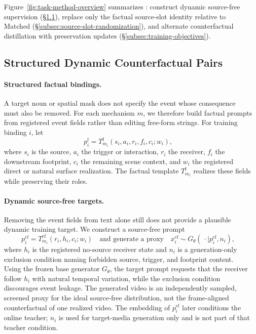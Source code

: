 \section{\methodname}
\label{sec:method}

Figure~\ref{fig:task-method-overview} summarizes \methodshort{}: construct
dynamic source-free supervision (\S\ref{subsec:counterfactual-pairs}),
replace only the factual source-slot identity relative to Matched
(\S\ref{subsec:source-slot-randomization}), and alternate counterfactual
distillation with preservation updates (\S\ref{subsec:training-objectives}).

\subsection{Structured Dynamic Counterfactual Pairs}
\label{subsec:counterfactual-pairs}

\paragraph{Structured factual bindings.}
A target noun or spatial mask does not specify the event whose consequence
must also be removed. For each mechanism \(m\), we therefore build factual
prompts from registered event fields rather than editing free-form strings.
For training binding \(i\), let
\begin{equation}
  p_i^{\mathrm{f}}
  =
  T_{m_i}^{\mathrm f}(s_i,a_i,r_i,f_i,c_i;w_i),
  \label{eq:factual-prompt}
\end{equation}
where \(s_i\) is the source, \(a_i\) the trigger or interaction, \(r_i\)
the receiver, \(f_i\) the downstream footprint, \(c_i\) the remaining scene
context, and \(w_i\) the registered direct or natural surface realization.
The factual template \(T_{m_i}^{\mathrm f}\) realizes these fields while
preserving their roles.

\paragraph{Dynamic source-free targets.}
Removing the event fields from text alone still does not provide a plausible
dynamic training target. We construct a source-free prompt
\begin{equation}
  p_i^{\mathrm{cf}}
  =
  T_{m_i}^{\mathrm{cf}}(r_i,h_i,c_i;w_i)
  \quad\text{and generate a proxy}\quad
  x_i^{\mathrm{cf}}
  \sim G_{\theta}(\,\cdot\mid p_i^{\mathrm{cf}},n_i),
  \label{eq:distributional-counterfactual}
\end{equation}
where \(h_i\) is the registered no-source receiver state and \(n_i\) is a
generation-only exclusion condition naming forbidden source, trigger, and
footprint content. Using the frozen base generator \(G_{\theta}\), the target
prompt requests that the receiver follow \(h_i\) with natural temporal
variation, while the exclusion condition discourages event leakage. The
generated video is an independently sampled, screened proxy for the ideal
source-free distribution, not the frame-aligned counterfactual of one
realized video. The embedding of \(p_i^{\mathrm{cf}}\) later conditions the
online teacher; \(n_i\) is used for target-media generation only and is not
part of that teacher condition.

